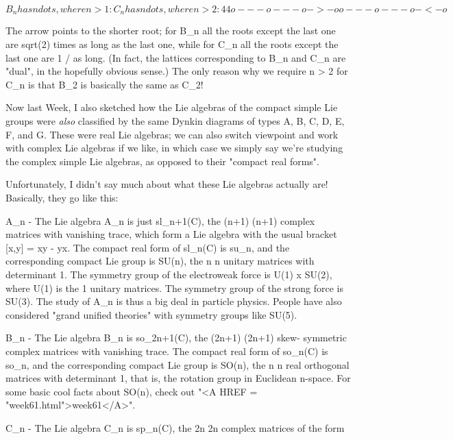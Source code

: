 $$

B_{n} has n dots, where n > 1:       C_{n} has n dots, where n > 2:

          4                                  4
o---o---o->-o                      o---o---o-<-o
$$
    

The arrow points to the shorter root; for B_{n} all the roots
except the last one are sqrt(2) times as long as the last one, while
for C_{n} all the roots except the last one are 1 /  as
long.  (In fact, the lattices corresponding to B_{n} and
C_{n} are "dual", in the hopefully obvious sense.)  The only
reason why we require n > 2 for C_{n} is that B_{2} is
basically the same as C_{2}!

Now last Week, I also sketched how the Lie algebras of the compact
simple Lie groups were \emph{also} classified by the same Dynkin diagrams
of types A, B, C, D, E, F, and G.  These were real Lie algebras; we
can also switch viewpoint and work with complex Lie algebras if we
like, in which case we simply say we're studying the complex simple
Lie algebras, as opposed to their "compact real forms".

Unfortunately, I didn't say much about what these Lie algebras actually
are!  Basically, they go like this:

A_{n} - The Lie algebra A_{n} is just sl_{n+1}(C),
the (n+1) \times  (n+1) complex matrices with vanishing trace, which form a
Lie algebra with the usual bracket [x,y] = xy - yx.  The compact real
form of sl_{n}(C) is su_{n}, and the corresponding
compact Lie group is SU(n), the n \times  n unitary matrices with
determinant 1.  The symmetry group of the electroweak force is U(1) x
SU(2), where U(1) is the 1  unitary matrices.  The symmetry group
of the strong force is SU(3).  The study of A_{n} is thus a
big deal in particle physics.  People have also considered "grand
unified theories" with symmetry groups like SU(5).

B_{n} - The Lie algebra B_{n} is
so_{2n+1}(C), the (2n+1) \times  (2n+1) skew- symmetric complex
matrices with vanishing trace.  The compact real form of
so_{n}(C) is so_{n}, and the corresponding compact Lie
group is SO(n), the n \times  n real orthogonal matrices with determinant 1,
that is, the rotation group in Euclidean n-space.  For some basic cool
facts about SO(n), check out "<A HREF = "week61.html">week61</A>".

C_{n} - The Lie algebra C_{n} is sp_{n}(C),
the 2n \times  2n complex matrices of the form


